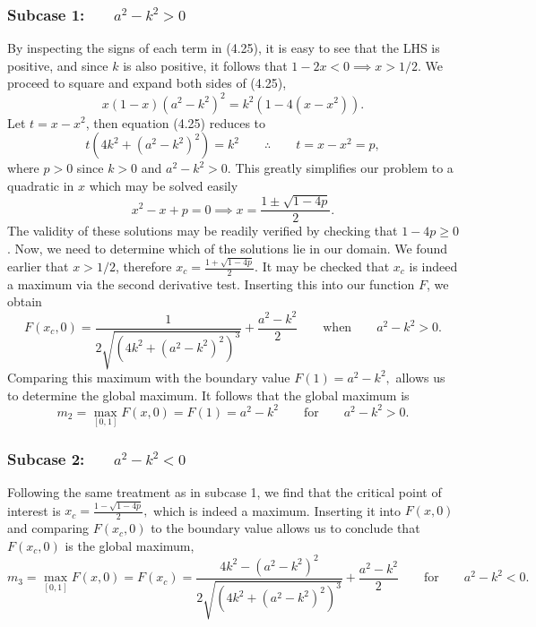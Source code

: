 \documentclass[11pt,reqno]{amsart}
\theoremstyle{definition}
\numberwithin{equation}{section} \setcounter{tocdepth}{1}
\numberwithin{equation}{section}
\begin{document}
\subsubsection{Subcase 1:$\qquad a^2-k^2>0$}
By inspecting the signs of each term in (4.25), it is easy to see that the LHS is positive, and since $k$ is also positive, it follows that $1-2x<0 \implies x>1/2.$ We proceed to square and expand both sides of (4.25),
\begin{equation}
    x(1-x)(a^2-k^2)^2=k^2(1-4(x-x^2)).
\end{equation}Let $t=x-x^2$, then equation (4.25) reduces to
\begin{equation}
    t(4k^2+(a^2-k^2)^2)=k^2 \qquad \therefore \qquad t=x-x^2=p,
\end{equation}where $p>0$ since $k>0$ and $a^2-k^2>0$. This greatly simplifies our problem to a quadratic in $x$ which may be solved easily
\begin{equation}
    x^2-x+p=0 \implies x=\frac{1\pm \sqrt{1-4p}}{2}.
\end{equation} The validity of these solutions may be readily verified by checking that $1-4p\geq0$. Now, we need to determine which of the solutions lie in our domain. We found earlier that $x>1/2$, therefore $x_c=\frac{1+\sqrt{1-4p}}{2}.$ It may be checked that $x_c$ is indeed a maximum via the second derivative test. Inserting this into our function $F$, we obtain
\begin{equation}
    F(x_c,0)=\frac{1}{2\sqrt{(4k^2+(a^2-k^2)^2)^3}}+\frac{a^2-k^2}{2} \qquad \text{when} \qquad a^2-k^2>0.
\end{equation} Comparing this maximum with the boundary value $F(1)=a^2-k^2,$ allows us to determine the global maximum. It follows that the global maximum is
\begin{equation}
   m_2= \max_{[0,1]}F(x,0)=F(1)=a^2-k^2 \qquad \text{for} \qquad a^2-k^2>0.
\end{equation}
\subsubsection{Subcase 2:$\qquad a^2-k^2<0$}
Following the same treatment as in subcase 1, we find that the critical point of interest is $x_c=\frac{1-\sqrt{1-4p}}{2},$ which is indeed a maximum. Inserting it into $F(x,0)$ and comparing $F(x_c,0)$ to the boundary value allows us to conclude that $F(x_c,0)$ is the global maximum,
\begin{equation}
    m_3=\max_{[0,1]}F(x,0)=F(x_c)=\frac{4k^2-(a^2-k^2)^2}{2\sqrt{(4k^2+(a^2-k^2)^2)^3}}+\frac{a^2-k^2}{2} \qquad \text{for} \qquad a^2-k^2<0.
\end{equation}
\end{document}
